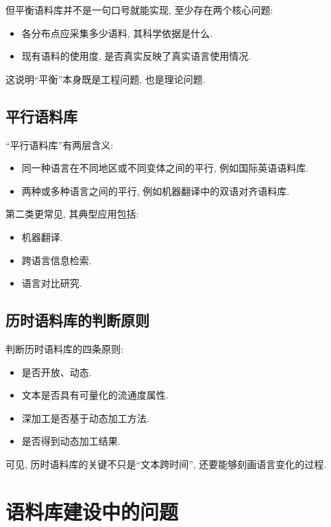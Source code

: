 但平衡语料库并不是一句口号就能实现, 至少存在两个核心问题:

\begin{itemize}
\item 各分布点应采集多少语料, 其科学依据是什么.
\item 现有语料的使用度, 是否真实反映了真实语言使用情况.
\end{itemize}

这说明“平衡”本身既是工程问题, 也是理论问题.

\subsection{平行语料库}


“平行语料库”有两层含义:

\begin{itemize}
\item 同一种语言在不同地区或不同变体之间的平行, 例如国际英语语料库.
\item 两种或多种语言之间的平行, 例如机器翻译中的双语对齐语料库.
\end{itemize}

第二类更常见, 其典型应用包括:

\begin{itemize}
\item 机器翻译.
\item 跨语言信息检索.
\item 语言对比研究.
\end{itemize}

\subsection{历时语料库的判断原则}


判断历时语料库的四条原则:

\begin{itemize}
\item 是否开放、动态.
\item 文本是否具有可量化的流通度属性.
\item 深加工是否基于动态加工方法.
\item 是否得到动态加工结果.
\end{itemize}

可见, 历时语料库的关键不只是“文本跨时间”, 还要能够刻画语言变化的过程.

\section{语料库建设中的问题}


